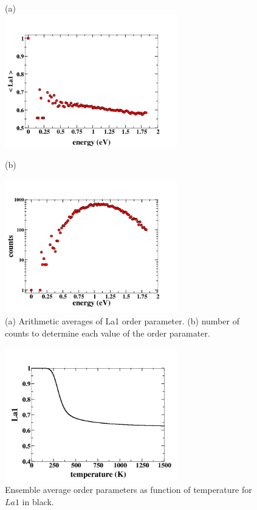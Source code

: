 \documentclass[aps,prl,reprint,superscriptaddress,showkeys]{revtex4-1}
\begin{document}
\begin{figure}
(a)\\
\includegraphics[width=7.5cm]{./figures/avg_OP.png}\\
\centerline{(b)}
\includegraphics[width=7.5cm]{./figures/OPcounts.png}
\caption{(a) Arithmetic averages of La1 order parameter. (b) number of counts to determine each value of the order paramater. \label{arithemetic_avg}}
\end{figure}

\begin{figure}
\includegraphics[width=7.5cm]{./figures/OP_ensemble_avg.png}
\caption{Ensemble average order parameters as function of temperature for $La1$ in black. \label{ensembleOP}}
\end{figure}
\end{document}
